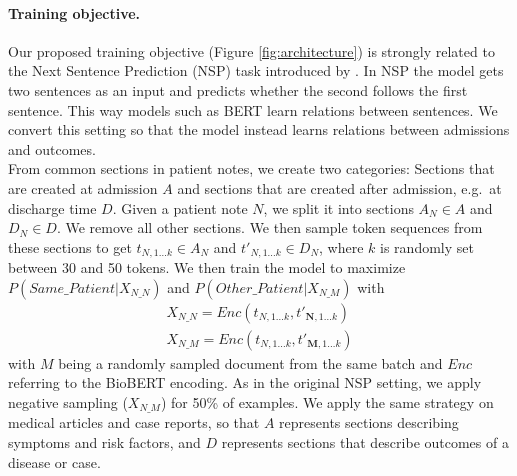 \documentclass[11pt,a4paper]{article}
\begin{document}
\paragraph{Training objective.} Our proposed training objective (Figure \ref{fig:architecture}) is strongly related to the Next Sentence Prediction (NSP) task introduced by \citet{bert}. In NSP the model gets two sentences as an input and predicts whether the second follows the first sentence. This way models such as BERT learn relations between sentences. We convert this setting so that the model instead learns relations between admissions and outcomes.\\
From common sections in patient notes, we create two categories: Sections that are created at admission $A$ and sections that are created after admission, e.g.~at discharge time $D$.
Given a patient note $N$, we split it into sections $A_N \in A$ and $D_N \in D$. We remove all other sections. We then sample token sequences from these sections to get $t_{N, 1\dots k} \in A_N$ and $t'_{N, 1\dots k} \in D_N$, where $k$ is randomly set between 30 and 50 tokens. We then train the model to maximize $P(Same\_Patient|X_{N\_N})$ and $P(Other\_Patient|X_{N\_M})$ with
\begin{equation}
\begin{alignedat}{2}
    X_{N\_N} = Enc(t_{N, 1\dots k}, t'_{\textbf{N}, 1\dots k})
    \\
    X_{N\_M} = Enc(t_{N, 1\dots k}, t'_{\textbf{M}, 1\dots k})
\end{alignedat}
\end{equation}
with $M$ being a randomly sampled document from the same batch and $Enc$ referring to the BioBERT encoding. As in the original NSP setting, we apply negative sampling ($X_{N\_M}$)  for 50\% of examples. We apply the same strategy on medical articles and case reports, so that $A$ represents sections describing symptoms and risk factors, and $D$ represents sections that describe outcomes of a disease or case.
\end{document}
